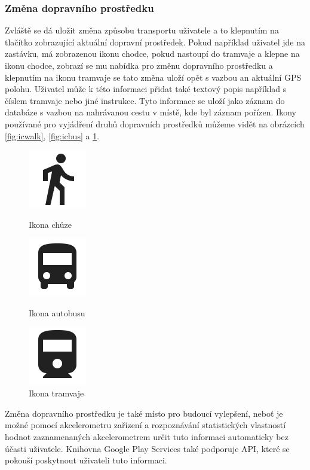 \documentclass[czech,master,public,dept460,male,java,cpdeclaration]{diploma}
\begin{document}
\subsubsection{Změna dopravního prostředku}
Zvláště se dá uložit změna způsobu transportu uživatele a to klepnutím na tlačítko zobrazující
aktuální dopravní prostředek. Pokud například uživatel jde na zastávku, má zobrazenou ikonu chodce,
pokud nastoupí do tramvaje a klepne na ikonu chodce, zobrazí se mu nabídka pro změnu dopravního
prostředku a klepnutím na ikonu tramvaje se tato změna uloží opět s vazbou an aktuální GPS polohu.
Uživatel může k této informaci přidat také textový popis například s číslem tramvaje nebo jiné instrukce.
Tyto informace se uloží jako záznam do databáze s vazbou na nahrávanou cestu v místě, kde byl záznam pořízen.
Ikony používané pro vyjádření druhů dopravních prostředků můžeme vidět na obrázcích \ref{fig:icwalk},
\ref{fig:icbus} a \ref{fig:ictram}.

\begin{figure}[H]
  \centering
  \includegraphics[scale=0.2]{img/ic_directions_walk_black_24dp.png}
  \caption{Ikona chůze}\label{fig:icwalk}
\endminipage\hfill
{}
  \centering
  \includegraphics[scale=0.2]{img/ic_directions_bus_black_24dp.png}
  \caption{Ikona autobusu}\label{fig:icbus}
\endminipage\hfill
{}%
  \centering
  \includegraphics[scale=0.2]{img/ic_directions_railway_black_24dp.png}
  \caption{Ikona tramvaje}\label{fig:ictram}
\endminipage
\end{figure}

Změna dopravního prostředku je také místo pro budoucí vylepšení, neboť je možné pomocí akcelerometru
zařízení a rozpoznávání statistických vlastností hodnot zaznamenaných akcelerometrem určit tuto informaci
automaticky bez účasti uživatele. Knihovna Google Play Services také podporuje API, které se pokouší
poskytnout uživateli tuto informaci.
\end{document}
